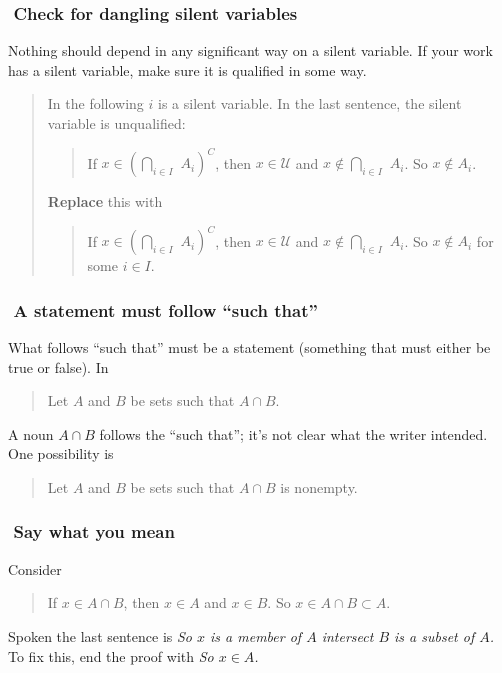 \documentclass[12pt]{article}
\newcounter{ex}\setcounter{ex}{0}
\newcommand{\ex}{%
\hspace{-0.2in} \setcounter{ex}{\value{ex}+1}
\theex \,\,}
\newcounter{id}\setcounter{id}{0}
\newcounter{se}\setcounter{se}{0}
\begin{document}
\subsubsection*{\ex Check for dangling silent variables}

Nothing should depend in any significant way on a  silent variable. If your
work has a  silent variable, make sure it is qualified in some way.


\begin{quote}
In the following \(i\) is a  silent variable. In the last sentence, the
 silent variable is unqualified:
\begin{quote}
If \(x \in \left(\underset{i \in I}{\bigcap} \,\, A_i \right)^C\), then
\(x \in \mathcal{U}\) and \(x \notin \underset{i \in I}{\bigcap} \,\, A_i\).
So \(x \notin A_i\).
\end{quote}
\textbf{Replace} this with
\begin{quote}
If \(x \in \left(\underset{i \in I}{\bigcap} \,\, A_i \right)^C\), then
\(x \in \mathcal{U}\) and \(x \notin \underset{i \in I}{\bigcap} \,\, A_i\).
So \(x \notin A_i\) for some \(i \in I\).
\end{quote}
\end{quote}

\subsubsection*{\ex A statement must follow ``such that'' }

What follows ``such that'' must be a statement (something that must either
be true or false).  In 

\begin{quote}
Let \(A\) and \(B\) be sets such that \(A \cap B\).
\end{quote}
A noun \(A \cap B\) follows the ``such that''; it's not clear what the writer intended.
One possibility is 
\begin{quote}
Let \(A\) and \(B\) be sets such that \(A \cap B\) is nonempty.
\end{quote}

\subsubsection*{\ex Say what you mean }

Consider
\begin{quote}
If \(x \in A \cap B\), then \(x \in A\) and \(x \in B\). So
\(x \in A \cap B \subset A\).
\end{quote}
Spoken the last sentence is 
 \emph{So \(x\) is a member of \(A\) intersect \(B\) is a subset of \(A\).} To fix this,
end the proof with \emph{So \(x \in A\).}
\end{document}
